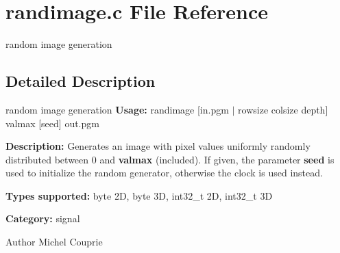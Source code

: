\section{randimage.c File Reference}
\label{randimage_8c}


random image generation  




\subsection{Detailed Description}
random image generation {\bfseries Usage:} randimage [in.pgm $|$ rowsize colsize depth] valmax [seed] out.pgm

{\bfseries Description:} Generates an image with pixel values uniformly randomly distributed between 0 and {\bfseries valmax} (included). If given, the parameter {\bfseries seed} is used to initialize the random generator, otherwise the clock is used instead.

{\bfseries Types supported:} byte 2D, byte 3D, int32\_\-t 2D, int32\_\-t 3D

{\bfseries Category:} signal

\begin{DoxyAuthor}{Author}
Michel Couprie 
\end{DoxyAuthor}
